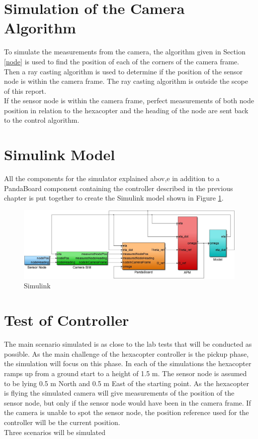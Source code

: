 \section{Simulation of the Camera Algorithm}
To simulate the measurements from the camera, the algorithm given in Section \ref{node} is used to find the position of each of the corners of the camera frame. Then a ray casting algorithm is used to determine if the position of the sensor node is within the camera frame. The ray casting algorithm is outside the scope of this report.\\
\newline
If the sensor node is within the camera frame, perfect measurements of both node position in relation to the hexacopter and the heading of the node are sent back to the control algorithm.
\section{Simulink Model}
All the components for the simulator explained abov,e in addition to a PandaBoard component containing the controller described in the previous chapter is put together to create the Simulink model shown in Figure  \ref{simulink}.
\begin{figure}[H]
\centering
\includegraphics[width = 18cm]{fig/simulink.jpg}
\caption{Simulink}
\label{simulink}
\end{figure}
\section{Test of Controller}
The main scenario simulated is as close to the lab tests that will be conducted as possible. As the main challenge of the hexacopter controller is the pickup phase, the simulation will focus on this phase. In each of the simulations the hexacopter ramps up from a ground start to a height of 1.5 m. The sensor node is assumed to be lying 0.5 m North and 0.5 m East of the starting point. As the  hexacopter is flying the simulated camera will give measurements of the position of the sensor node, but only if the sensor node would have been in the camera frame. If the camera is unable to spot the sensor node, the position reference used for the controller will be the current position.\\
\newline
Three scenarios will be simulated
